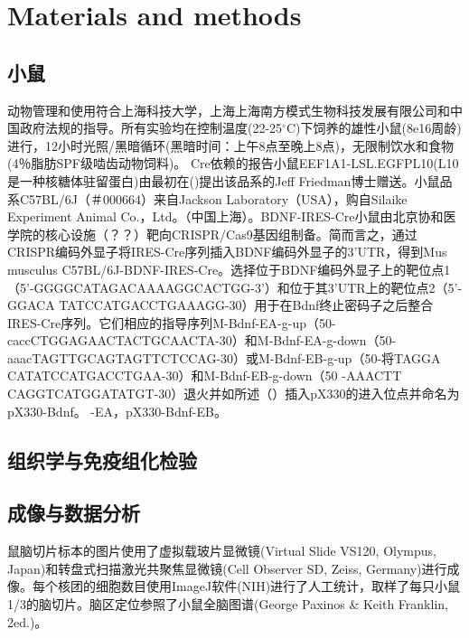 \chapter{Materials and methods}

\section{小鼠}
动物管理和使用符合上海科技大学，上海上海南方模式生物科技发展有限公司和中国政府法规的指导。所有实验均在控制温度(22-25$^\circ$C)下饲养的雄性小鼠(8e16周龄)进行，12小时光照/黑暗循环(黑暗时间：上午8点至晚上8点)，无限制饮水和食物(4％脂肪SPF级啮齿动物饲料)。
Cre依赖的报告小鼠EEF1A1-LSL.EGFPL10(L10是一种核糖体驻留蛋白)由最初在(\cite{stanley2013profiling})提出该品系的Jeff Friedman博士赠送。小鼠品系C57BL/6J（＃000664）来自Jackson Laboratory（USA），购自Silaike Experiment Animal Co.，Ltd。（中国上海）。BDNF-IRES-Cre小鼠由北京协和医学院的核心设施（？？）靶向CRISPR/Cas9基因组制备。简而言之，通过CRISPR编码外显子将IRES-Cre序列插入BDNF编码外显子的3'UTR，得到Mus musculus C57BL/6J-BDNF-IRES-Cre。选择位于BDNF编码外显子上的靶位点1（5'-GGGGCATAGACAAAAGGCACTGG-3'）和位于其3'UTR上的靶位点2（5'-GGACA TATCCATGACCTGAAAGG-30）用于在Bdnf终止密码子之后整合IRES-Cre序列。它们相应的指导序列M-Bdnf-EA-g-up（50-caccCTGGAGAACTACTGCAACTA-30）和M-Bdnf-EA-g-down（50-aaacTAGTTGCAGTAGTTCTCCAG-30）或M-Bdnf-EB-g-up（50-将TAGGA CATATCCATGACCTGAA-30）和M-Bdnf-EB-g-down（50 -AAACTT CAGGTCATGGATATGT-30）退火并如所述（\cite{mizuno2014simple}）插入pX330的进入位点并命名为pX330-Bdnf。 -EA，pX330-Bdnf-EB。
\section{}

\section{}

\section{组织学与免疫组化检验}

\section{成像与数据分析}
鼠脑切片标本的图片使用了虚拟载玻片显微镜(Virtual Slide VS120, Olympus, Japan)和转盘式扫描激光共聚焦显微镜(Cell Observer SD, Zeiss, Germany)进行成像。每个核团的细胞数目使用ImageJ软件(NIH)进行了人工统计，取样了每只小鼠1/3的脑切片。脑区定位参照了小鼠全脑图谱(George Paxinos \& Keith Franklin, 2ed.)。
